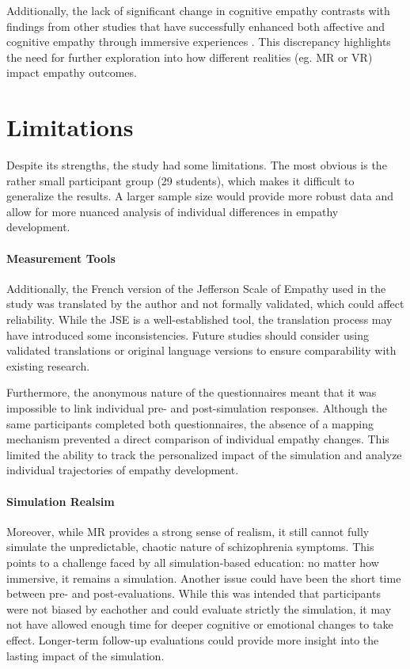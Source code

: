 \vspace{1em}

Additionally, the lack of significant change in cognitive empathy contrasts with findings from other studies that have successfully enhanced both affective and cognitive empathy through immersive experiences \cite{Rueda2020, Ando2011}. This discrepancy highlights the need for further exploration into how different realities (eg. MR or VR) impact empathy outcomes.


\section{Limitations}

Despite its strengths, the study had some limitations. The most obvious is the rather small participant group (29 students), which makes it difficult to generalize the results. A larger sample size would provide more robust data and allow for more nuanced analysis of individual differences in empathy development.

\paragraph{Measurement Tools} Additionally, the French version of the Jefferson Scale of Empathy used in the study was translated by the author and not formally validated, which could affect reliability. While the JSE is a well-established tool, the translation process may have introduced some inconsistencies. Future studies should consider using validated translations or original language versions to ensure comparability with existing research.

\vspace{1em}
Furthermore, the anonymous nature of the questionnaires meant that it was impossible to link individual pre- and post-simulation responses. Although the same participants completed both questionnaires, the absence of a mapping mechanism prevented a direct comparison of individual empathy changes. This limited the ability to track the personalized impact of the simulation and analyze individual trajectories of empathy development.


\paragraph{Simulation Realsim} Moreover, while MR provides a strong sense of realism, it still cannot fully simulate the unpredictable, chaotic nature of schizophrenia symptoms. This points to a challenge faced by all simulation-based education: no matter how immersive, it remains a simulation. Another issue could have been the short time between pre- and post-evaluations. While this was intended that participants were not biased by eachother and could evaluate strictly the simulation, it may not have allowed enough time for deeper cognitive or emotional changes to take effect. Longer-term follow-up evaluations could provide more insight into the lasting impact of the simulation.

